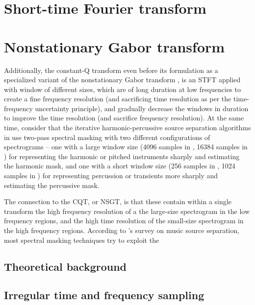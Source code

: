 \documentclass[letter,12pt,notitlepage]{article}
\begin{document}
\vfill
\clearpage

\section{Short-time Fourier transform}
\label{sec:theorystft}

\vfill
\clearpage

\section{Nonstationary Gabor transform}
\label{sec:theorynsgt}

Additionally, the constant-Q transform \cite{jbrown, klapuricqt, invertiblecqt} even before its formulation as a specialized variant of the nonstationary Gabor transform \cite{balazs}, is an STFT applied with window of different sizes, which are of long duration at low frequencies to create a fine frequency resolution (and sacrificing time resolution as per the time-frequency uncertainty principle), and gradually decrease the windows in duration to improve the time resolution (and sacrifice frequency resolution). At the same time, consider that the iterative harmonic-percussive source separation algorithms in \cite{driedger, fitzgerald2} use two-pass spectral masking with two different configurations of spectrograms -- one with a large window size (4096 samples in \cite{driedger}, 16384 samples in \cite{fitzgerald2}) for representing the harmonic or pitched instruments sharply and estimating the harmonic mask, and one with a short window size (256 samples in \cite{driedger}, 1024 samples in \cite{fitzgerald2}) for representing percussion or transients more sharply and estimating the percussive mask.

The connection to the CQT, or NSGT, is that these contain within a single transform the high frequency resolution of a the large-size spectrogram in the low frequency regions, and the high time resolution of the small-size spectrogram in the high frequency regions. According to \citet{musicsepgood}'s survey on music source separation, most spectral masking techniques try to exploit the 

\subsection{Theoretical background}


\subsection{Irregular time and frequency sampling}
\end{document}
